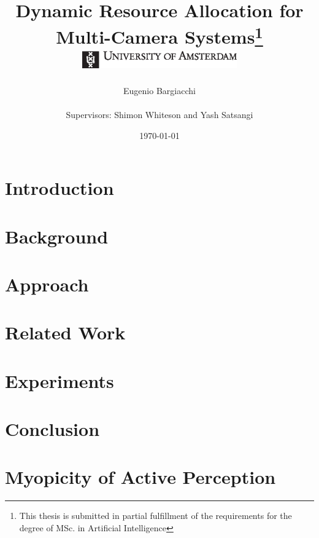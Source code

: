 \documentclass[10pt,twoside]{report}
\title{
    {Dynamic Resource Allocation for Multi-Camera Systems\thanks{This thesis is submitted in
    partial fulfillment of the requirements for the degree of MSc. in Artificial
    Intelligence}}\\\vspace{1cm}
    {\includegraphics[width=0.5\textwidth]{UvA-logo}}
}
\author{Eugenio Bargiacchi\\\\Supervisors: Shimon Whiteson and Yash Satsangi}
\date{\today}
\begin{document}
\maketitle

\begin{abstract}

\end{abstract}


\tableofcontents

\chapter{Introduction}\label{ref:intro}


\chapter{Background}\label{ref:background}



\chapter{Approach}\label{ref:approach}


\chapter{Related Work}\label{ref:relwork}


\chapter{Experiments}\label{ref:experiments}


\chapter{Conclusion}\label{ref:conclusion}


\nocite{*}
\appendix

\chapter{Myopicity of Active Perception}\label{ref:appendix_proof}




\end{document}

